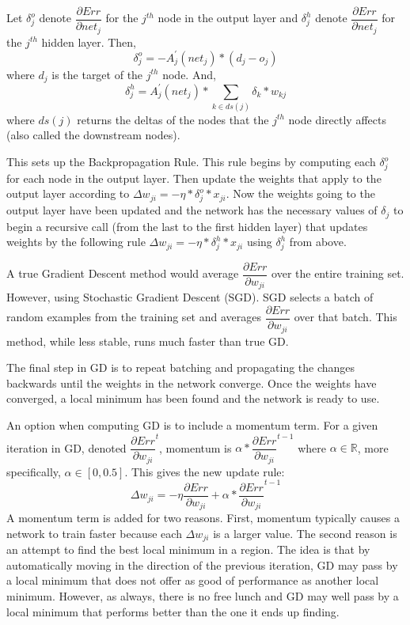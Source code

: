 \documentclass[twoside,11pt]{article}
\newcommand{\jth}{$j^{th}$ }
\begin{document}
Let $\delta _j^o$ denote $\dfrac{\partial Err}{\partial net_{j}}$ for the \jth node in the output layer and $\delta ^h_j$ denote $\dfrac{\partial Err}{\partial net_{j}}$ for the \jth hidden layer. 
Then, 
$$\delta _j^o = -A^\prime _j (net_j) * (d_j - o_j)$$
where $d_j$ is the target of the \jth node. And, 
$$\delta ^h_j = A^\prime _j (net_j) * \sum_{k \in ds(j)} \delta _k * w_{kj}$$ 
where $ds(j)$ returns the deltas of the nodes that the \jth node directly affects (also called the downstream nodes).

This sets up the Backpropagation Rule. This rule begins by computing each $\delta _j^o$ for each node in the output layer. Then update the weights that apply to the output layer according to 
$\Delta w_{ji} = - \eta * \delta _j^o * x_{ji}$.
Now the weights going to the output layer have been updated and the network has the necessary values of $\delta _j$ to begin a recursive call (from the last to the first hidden layer) that updates weights by the following rule
$\Delta w_{ji} = - \eta * \delta _j^h * x_{ji}$ using $\delta _j^h$ 
from above.

A true Gradient Descent method would average $\dfrac{\partial Err}{\partial w_{ji}}$ over the entire training set. However, using Stochastic Gradient Descent (SGD). SGD selects a batch of random examples from the training set and averages $\dfrac{\partial Err}{\partial w_{ji}}$ over that batch. This method, while less stable, runs much faster than true GD.

The final step in GD is to repeat batching and propagating the changes backwards until the weights in the network converge. Once the weights have converged, a local minimum has been found and the network is ready to use.

An option when computing GD is to include a momentum term. For a given iteration in GD, denoted 
$\dfrac{\partial Err}{\partial w_{ji}}^t$, momentum is $\alpha * \dfrac{\partial Err}{\partial w_{ji}}^{t-1}$ where $\alpha \in \mathbb{R}$, more specifically, $\alpha \in [0,0.5]$.
This gives the new update rule: 
$$\Delta w_{ji} = - \eta \dfrac{\partial Err}{\partial w_{ji}} + \alpha * \dfrac{\partial Err}{\partial w_{ji}}^{t-1}$$
A momentum term is added for two reasons. First, momentum typically causes a network to train faster because each $\Delta w_{ji}$ is a larger value.
The second reason is an attempt to find the best local minimum in a region. The idea is that by automatically moving in the direction of the previous iteration, GD may pass by a local minimum that does not offer as good of performance as another local minimum. However, as always, there is no free lunch and GD may well pass by a local minimum that performs better than the one it ends up finding.
\end{document}
